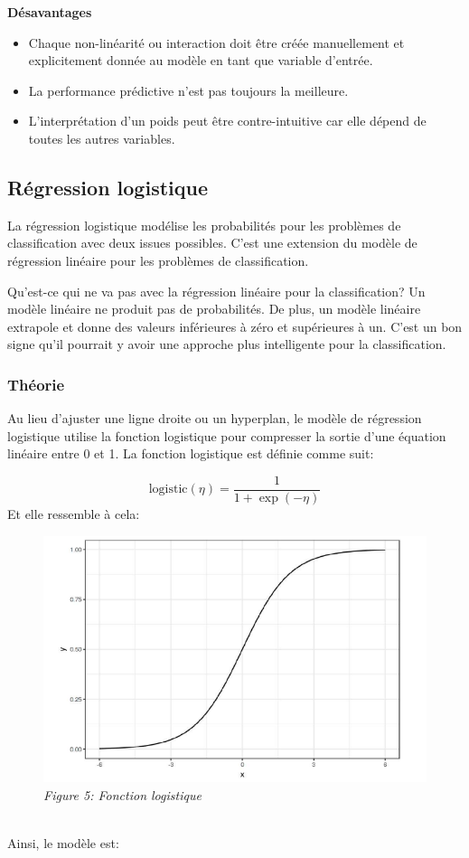 \textbf{Désavantages}

\begin{itemize}
    \item Chaque non-linéarité ou interaction doit être créée manuellement et explicitement donnée au modèle en tant que variable d'entrée.
    \item La performance prédictive n'est pas toujours la meilleure.
    \item L'interprétation d'un poids peut être contre-intuitive car elle dépend de toutes les autres variables.
\end{itemize}

\subsection{Régression logistique}

La régression logistique modélise les probabilités pour les problèmes de classification avec deux issues possibles. C'est une extension du modèle de régression linéaire pour les problèmes de classification.

\newline
Qu'est-ce qui ne va pas avec la régression linéaire pour la classification?
\newline
Un modèle linéaire ne produit pas de probabilités. De plus, un modèle linéaire extrapole et donne des valeurs inférieures à zéro et supérieures à un. C'est un bon signe qu'il pourrait y avoir une approche plus intelligente pour la classification.

\subsubsection{Théorie}

Au lieu d'ajuster une ligne droite ou un hyperplan, le modèle de régression logistique utilise la fonction logistique pour compresser la sortie d'une équation linéaire entre 0 et 1. La fonction logistique est définie comme suit:

\[
\text{logistic}(\eta)=\frac{1}{1+\exp(-\eta)}
\]
Et elle ressemble à cela:
\begin{figure}
    \centering
    \includegraphics[width=0.5\linewidth]{Images/logisitc_function.png}
    \\
    \emph{Figure 5: Fonction logistique}
    \\
\end{figure}
\\
Ainsi, le modèle est:

